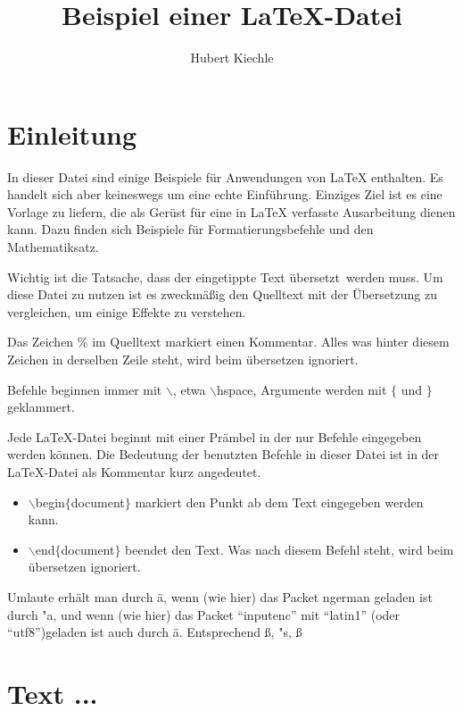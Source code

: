 \documentclass[12pt]{scrartcl}%
\theoremstyle{nonumberplain}
\begin{document}
\author{Hubert Kiechle}
\title{Beispiel einer LaTeX-Datei}
\date{} %

\maketitle %


\section*{Einleitung}  %

In dieser Datei sind einige Beispiele für Anwendungen von LaTeX
enthalten. Es handelt sich aber keineswegs um eine echte Einführung.
Einziges Ziel ist es eine Vorlage zu liefern, die als Gerüst für eine
in LaTeX verfasste Ausarbeitung dienen kann. Dazu finden sich Beispiele
für Formatierungsbefehle und den Mathematiksatz.

Wichtig ist die Tatsache, dass der eingetippte Text
\glqq übersetzt\grqq\ werden muss. Um diese Datei zu nutzen ist es
zweckmäßig den Quelltext mit der Übersetzung zu vergleichen, um einige
Effekte zu verstehen.

Das Zeichen \% %
im Quelltext markiert einen Kommentar. Alles was hinter diesem Zeichen
in derselben Zeile steht, wird beim \"ubersetzen ignoriert.

Befehle beginnen immer mit $\backslash$, etwa $\backslash$hspace,
Argumente werden mit $\{$ und $\}$ geklammert.


Jede LaTeX-Datei beginnt mit einer Prämbel in der nur Befehle
eingegeben werden können. Die Bedeutung der benutzten Befehle in
dieser Datei ist in der LaTeX-Datei als Kommentar kurz angedeutet.

\begin{itemize}
\item $\backslash$begin$\{$document$\}$ markiert den Punkt ab dem Text
eingegeben werden kann.
\item $\backslash$end$\{$document$\}$ beendet den Text. Was nach diesem
Befehl steht, wird beim übersetzen ignoriert.
\end{itemize}


Umlaute erhält man durch \"a, wenn (wie hier) das Packet ngerman
geladen ist durch "a, und wenn  (wie hier) das Packet ``inputenc'' mit
``latin1'' (oder ``utf8'')geladen ist auch durch ä. Entsprechend \ss, "s, ß


\section{Text ...}
\end{document}
